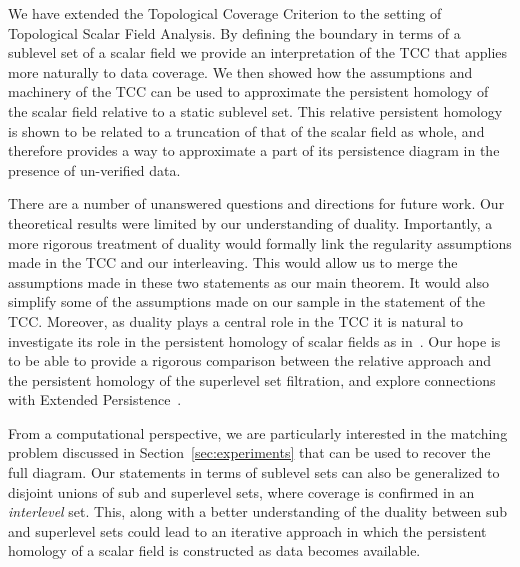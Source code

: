 
We have extended the Topological Coverage Criterion to the setting of Topological Scalar Field Analysis.
By defining the boundary in terms of a sublevel set of a scalar field we provide an interpretation of the TCC that applies more naturally to data coverage.
We then showed how the assumptions and machinery of the TCC can be used to approximate the persistent homology of the scalar field relative to a static sublevel set.
This relative persistent homology is shown to be related to a truncation of that of the scalar field as whole, and therefore provides a way to approximate a part of its persistence diagram in the presence of un-verified data.

There are a number of unanswered questions and directions for future work.
Our theoretical results were limited by our understanding of duality.
Importantly, a more rigorous treatment of duality would formally link the regularity assumptions made in the TCC and our interleaving.
This would allow us to merge the assumptions made in these two statements as our main theorem.
It would also simplify some of the assumptions made on our sample in the statement of the TCC.
Moreover, as duality plays a central role in the TCC it is natural to investigate its role in the persistent homology of scalar fields as in~\cite{edelsbrunner12alexander}.
Our hope is to be able to provide a rigorous comparison between the relative approach and the persistent homology of the superlevel set filtration, and explore connections with Extended Persistence~\cite{cohen09extending}.

From a computational perspective, we are particularly interested in the matching problem discussed in Section~\ref{sec:experiments} that can be used to recover the full diagram.
Our statements in terms of sublevel sets can also be generalized to disjoint unions of sub and superlevel sets, where coverage is confirmed in an \emph{interlevel} set.
This, along with a better understanding of the duality between sub and superlevel sets could lead to an iterative approach in which the persistent homology of a scalar field is constructed as data becomes available.

